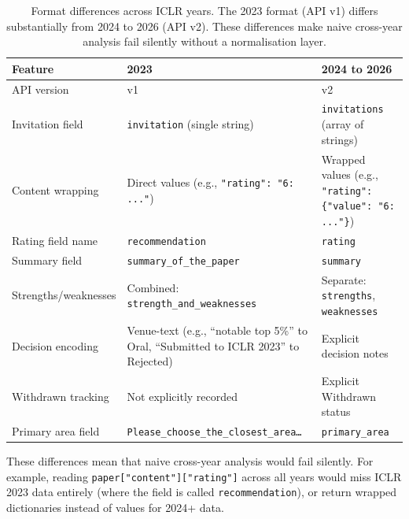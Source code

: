 \documentclass{article}
\newcommand{\code}[1]{\texttt{#1}}
\begin{document}
\begin{table}[htbp]
  \centering
  \caption{Format differences across ICLR years. The 2023 format (API v1) differs substantially from 2024 to 2026 (API v2). These differences make naive cross-year analysis fail silently without a normalisation layer.}
  \label{tab:format-differences}
  \small
  \begin{tabular}{p{3.5cm} p{5cm} p{5cm}}
    \toprule
    \textbf{Feature} & \textbf{2023} & \textbf{2024 to 2026} \\
    \midrule
    API version
      & v1
      & v2 \\
    Invitation field
      & \code{invitation} (single string)
      & \code{invitations} (array of strings) \\
    Content wrapping
      & Direct values (e.g., \code{"rating": "6: ..."})
      & Wrapped values (e.g., \code{"rating": \{"value": "6: ..."\}}) \\
    Rating field name
      & \code{recommendation}
      & \code{rating} \\
    Summary field
      & \code{summary\_of\_the\_paper}
      & \code{summary} \\
    Strengths/weaknesses
      & Combined: \code{strength\_and\_weaknesses}
      & Separate: \code{strengths}, \code{weaknesses} \\
    Decision encoding
      & Venue-text (e.g., ``notable top 5\%'' to Oral, ``Submitted to ICLR 2023'' to Rejected)
      & Explicit decision notes \\
    Withdrawn tracking
      & Not explicitly recorded
      & Explicit Withdrawn status \\
    Primary area field
      & \code{Please\_choose\_the\_closest\_area\ldots}
      & \code{primary\_area} \\
    \bottomrule
  \end{tabular}
\end{table}

These differences mean that naive cross-year analysis would fail silently. For example, reading \code{paper["content"]["rating"]} across all years would miss ICLR 2023 data entirely (where the field is called \code{recommendation}), or return wrapped dictionaries instead of values for 2024+ data.
\end{document}
